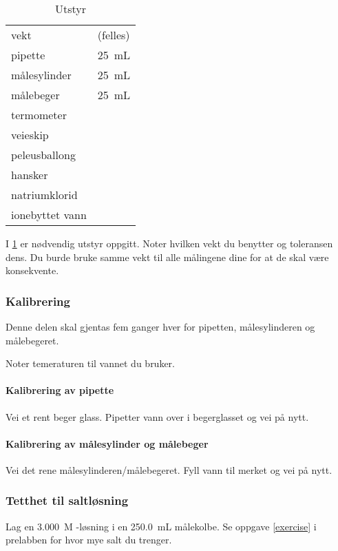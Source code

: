 \documentclass[hidelinks,12pt,norsk,a4paper,fleqn]{scrartcl}
\begin{document}
	\begin{table}[H]
		\caption{Utstyr}
		\begin{tabular}{ll}
			\toprule
			vekt & (felles) \\
			pipette & \SI{25}{mL} \\
			målesylinder & \SI{25}{mL} \\
			målebeger & \SI{25}{mL} \\
			termometer & \\
			veieskip & \\
			peleusballong & \\
			hansker & \\
			natriumklorid & \\
			ionebyttet vann & \\ \bottomrule 
		\end{tabular}
		\label{equipment}
	\end{table}
	
	I \cref{equipment} er nødvendig utstyr oppgitt.	Noter hvilken vekt du benytter og toleransen dens. Du burde bruke samme vekt til alle målingene dine for at de skal være konsekvente.
	
	\subsubsection{Kalibrering}
	
	Denne delen skal gjentas fem ganger hver for pipetten, målesylinderen og målebegeret. 
	
	Noter temeraturen til vannet du bruker. 
	
	\paragraph{Kalibrering av pipette}
	Vei et rent beger glass. Pipetter vann over i begerglasset og vei på nytt.
	
	\paragraph{Kalibrering av målesylinder og målebeger}
	Vei det rene målesylinderen/målebegeret. Fyll vann til merket og vei på nytt.
	
	\subsubsection{Tetthet til saltløsning}
	Lag en \SI{3.000}{M} -løsning i en \SI{250.0}{mL} målekolbe. Se oppgave \ref{exercise} i prelabben for hvor mye salt du trenger. 
	
\end{document}
